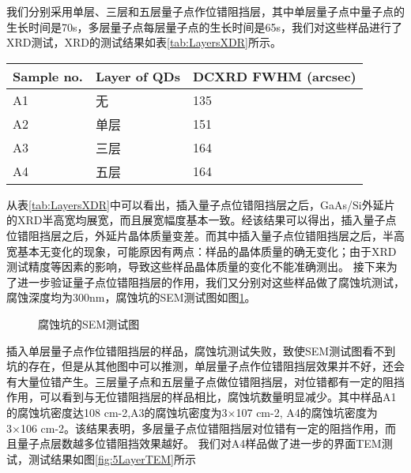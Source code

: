 我们分别采用单层、三层和五层量子点作位错阻挡层，其中单层量子点中量子点的生长时间是70s，多层量子点每层量子点的生长时间是65s，我们对这些样品进行了XRD测试，XRD的测试结果如表\ref{tab:LayersXDR}所示。

\begin{table*}[htbp] 
	\centering
	\caption{\label{tab:LayersXDR}多层XDR测试结果}  
	\begin{tabular}{m{}<{\centering}m{}<{\centering}m{}<{\centering}}
		\toprule
			Sample no. & Layer of QDs & DCXRD FWHM (arcsec) \\
		\midrule 
			A1 & 无 & 135 \\
			A2 & 单层 & 151 \\
			A3 & 三层 & 164 \\
			A4 & 五层 & 164 \\
		\bottomrule
	\end{tabular}
\end{table*}

从表\ref{tab:LayersXDR}中可以看出，插入量子点位错阻挡层之后，GaAs/Si外延片的XRD半高宽均展宽，而且展宽幅度基本一致。经该结果可以得出，插入量子点位错阻挡层之后，外延片晶体质量变差。而其中插入量子点位错阻挡层之后，半高宽基本无变化的现象，可能原因有两点：样品的晶体质量的确无变化；由于XRD测试精度等因素的影响，导致这些样品晶体质量的变化不能准确测出。
接下来为了进一步验证量子点位错阻挡层的作用，我们又分别对这些样品做了腐蚀坑测试，腐蚀深度均为300nm，腐蚀坑的SEM测试图如图\ref{fig:LayersSEM}。

\begin{figure}[ht]
	\centering
	\caption{腐蚀坑的SEM测试图}
	\label{fig:LayersSEM}
\end{figure}

插入单层量子点作位错阻挡层的样品，腐蚀坑测试失败，致使SEM测试图看不到坑的存在，但是从其他图中可以推测，单层量子点作位错阻挡层效果并不好，还会有大量位错产生。三层量子点和五层量子点做位错阻挡层，对位错都有一定的阻挡作用，可以看到与无位错阻挡层的样品相比，腐蚀坑数量明显减少。其中样品A1的腐蚀坑密度达108 cm-2,A3的腐蚀坑密度为3×107 cm-2, A4的腐蚀坑密度为3×106 cm-2。该结果表明，多层量子点位错阻挡层对位错有一定的阻挡作用，而且量子点层数越多位错阻挡效果越好。
我们对A4样品做了进一步的界面TEM测试，测试结果如图\ref{fig:5LayerTEM}所示

